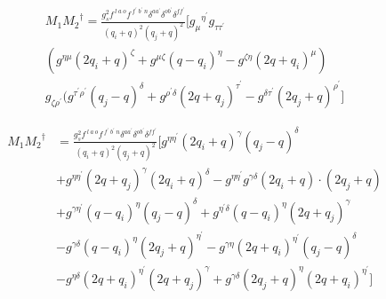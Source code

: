 \begin{equation}
\begin{split}
M_1{M_2}^{\dagger}=\frac{g_s^2 f^{\:l\:a\:o} f^{\:f^{\prime}\: b^{\prime}\:n} \delta^{aa^{\prime}} \delta^{ob^{\prime}} \delta^{ff^{\prime}}}{(q_i +q)^2 (q_j +q)^2}
[{g_{{\mu}}}^{{\eta}^{\prime}} g_{{\tau}{{\tau}^{\prime}}}\\(g^{{\eta}{\mu}}(2q_i+q)^{\zeta}+g^{{\mu}{\zeta}}(q -q_i)^{\eta}-g^{{\zeta}{\eta}}(2q +q_i)^{\mu})\\g_{{{\zeta}}{{\rho}^{\prime}}}(g^{{{\tau}^{\prime}}{{\rho}^{\prime}}}(q_j-q)^{{\delta}}+g^{{{\rho}^{\prime}}{{\delta}}}(2q +q_j)^{{\tau}^{\prime}}-g^{{{\delta}}{{\tau}^{\prime}}}(2q_j+q)^{{\rho}^{\prime}}]
\end{split}
\end{equation}


\begin{equation}
\begin{split}
M_1{M_2}^{\dagger}&=\frac{g_s^2 f^{\:l\:a\:o} f^{\:f^{\prime}\: b^{\prime}\:n} \delta^{aa^{\prime}} \delta^{ob^{\prime}} \delta^{ff^{\prime}}}{(q_i +q)^2 (q_j +q)^2}
[g^{{{\eta}}{{\eta}^{\prime}}}(2q_i+q)^{\gamma}(q_j-q)^{{\delta}}\\
&+g^{{{\eta}}{{\eta}^{\prime}}}(2q +q_j)^{\gamma}(2q_i+q)^{{\delta}}-g^{{{\eta}}{{\eta}^{\prime}}}g^{{{\gamma}}{{\delta}}}(2q_i+q)\cdot (2q_j+q)\\
&+g^{{{\gamma}}{{\eta}^{\prime}}}(q -q_i)^{\eta}(q_j-q)^{{\delta}}+g^{{{\eta}^{\prime}}{{\delta}}}(q -q_i)^{\eta}(2q +q_j)^{{\gamma}}\\
&-g^{{{\gamma}}{{\delta}}}(q -q_i)^{\eta}(2q_j+q)^{{\eta}^{\prime}}-g^{{{\gamma}}{{\eta}}}(2q +q_i)^{{\eta}^{\prime}}(q_j-q)^{{\delta}}\\
&-g^{{{\eta}}{{\delta}}}(2q +q_i)^{{\eta}^{\prime}}(2q +q_j)^{{\gamma}}
+g^{{{\gamma}}{{\delta}}}(2q_j+q)^{{\eta}}(2q +q_i)^{{\eta}^{\prime}}]
\end{split}
\end{equation}


